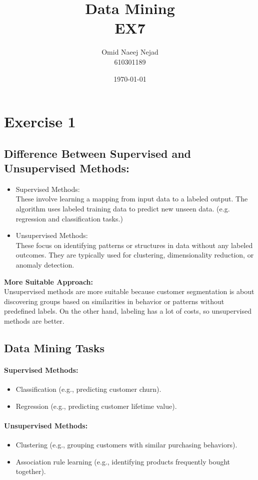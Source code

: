 \documentclass[12pt]{article}
\title{Data Mining \\ EX7}
\date{\today}
\author{Omid Naeej Nejad \\ 610301189}
\begin{document}
	\maketitle
	\section{Exercise 1}	
	\subsection{Difference Between Supervised and Unsupervised Methods:}	
	\begin{itemize}
		\item Supervised Methods:\\
		These involve learning a mapping from input data to a labeled output. The algorithm uses labeled training data to predict new unseen data. (e.g. regression and classification tasks.)

		\item Unsupervised Methods:\\ 
		These focus on identifying patterns or structures in data without any labeled outcomes. They are typically used for clustering, dimensionality reduction, or anomaly detection.
	\end{itemize}	
	
	\textbf{More Suitable Approach:}\\  
	Unsupervised methods are more suitable because customer segmentation is about discovering groups based on similarities in behavior or patterns without predefined labels. On the other hand, labeling has a lot of costs, so unsupervised methods are better.

	\subsection{Data Mining Tasks}	
	\paragraph{Supervised Methods:}
	\begin{itemize}
		\item Classification (e.g., predicting customer churn).
		\item Regression (e.g., predicting customer lifetime value).
	\end{itemize}	

	\paragraph{Unsupervised Methods:}
	\begin{itemize}
		\item Clustering (e.g., grouping customers with similar purchasing behaviors).
		\item Association rule learning (e.g., identifying products frequently bought together).
	\end{itemize}	
	
\end{document}
